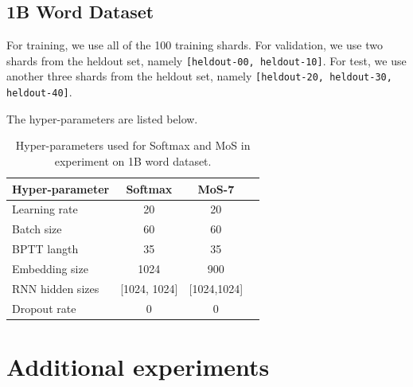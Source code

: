 \subsection{1B Word Dataset}
\label{sec:a-exp-1b}

For training, we use all of the 100 training shards.
For validation, we use two shards from the heldout set, namely \texttt{[heldout-00, heldout-10]}. 
For test, we use another three shards from the heldout set, namely \texttt{[heldout-20, heldout-30, heldout-40]}. 

The hyper-parameters are listed below.
\begin{table}[!h]
	\small
	\centering
	\begin{tabular}{l|ccc }
		\toprule
		\bf Hyper-parameter & \bf Softmax & \bf MoS-7 \\
		\midrule
		Learning rate & 20 & 20 & \\
		Batch size & 60 & 60 & \\
		BPTT langth & 35 & 35 & \\
		Embedding size & 1024 & 900 \\ 
		RNN hidden sizes & [1024, 1024] & [1024,1024] \\
		Dropout rate & 0 & 0 \\
		\bottomrule
	\end{tabular}
	\caption{\small
		Hyper-parameters used for Softmax and MoS in experiment on 1B word dataset.
	}
	\label{table:hyper-1b}
	\vspace{-1em}
\end{table}


\section{Additional experiments}

